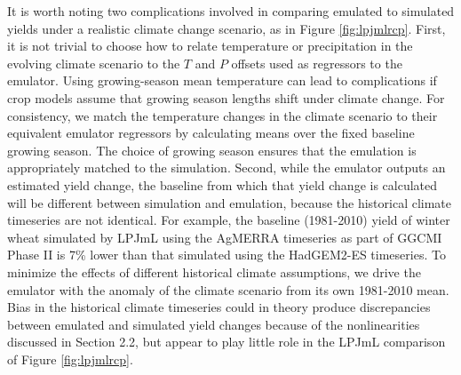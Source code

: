 \documentclass[gmd, manuscript]{copernicus} %
\begin{document}
It is worth noting two complications involved in comparing emulated to simulated yields under a realistic climate change scenario, as in Figure \ref{fig:lpjmlrcp}.
First, it is not trivial to choose how to relate temperature or precipitation in the evolving climate scenario to the $T$ and $P$ offsets used as regressors to the emulator. 
Using growing-season mean temperature can lead to complications if crop models assume that growing season lengths shift under climate change. 
For consistency, we match the temperature changes in the climate scenario to their equivalent emulator regressors by calculating means over the fixed baseline growing season. 
The choice of growing season ensures that the emulation is appropriately matched to the simulation.
Second, while the emulator outputs an estimated yield change, the baseline from which that yield change is calculated will be different between simulation and emulation, because the historical climate timeseries are not identical. For example, the baseline (1981-2010) yield of winter wheat simulated by LPJmL using the AgMERRA timeseries as part of GGCMI Phase II is 7\% lower than that simulated using the HadGEM2-ES timeseries. 
To minimize the effects of different historical climate assumptions, we drive the emulator with the anomaly of the climate scenario from its own 1981-2010 mean. 
Bias in the historical climate timeseries could in theory produce discrepancies between emulated and simulated yield changes because of the nonlinearities discussed in Section 2.2, but appear to play little role in the LPJmL comparison of Figure \ref{fig:lpjmlrcp}.

\end{document}
